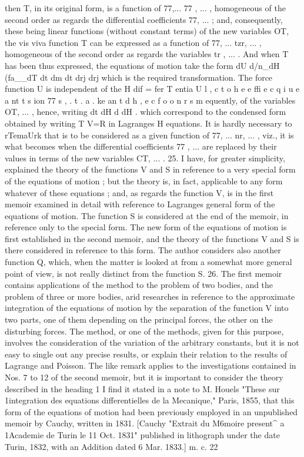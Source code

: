\documentclass[12pt,a4paper]{article}
\theoremstyle{definition}
\begin{document}
then T, in its original form, is a function of 77,... 77 , ... , homogeneous of the second
order as regards the differential coefficients 77, ... ; and, consequently, these being linear
functions (without constant terms) of the new variables OT, the vis viva function T
can be expressed as a function of 77, ... tzr, ... , homogeneous of the second order as
regards the variables tr , ... . And when T has been thus expressed, the equations of
motion take the form
dU
d/n_dH (fa__dT
dt dm dt drj drj
which is the required transformation. The force function U is independent of the
H dif = fer T entia U l , c t o h e e ffi e c q i u e a nt t s ion 77 s , . t . a . ke an t d h , e c f o o n r s m equently, of the variables OT, ... , hence, writing
dt dH d dH
.
which correspond to the condensed form obtained by writing T V=R in Lagranges
H
equations. It is hardly necessary to rTemaUrk that is to be considered as a given
function of 77, ... nr, ... , viz., it is what becomes when the differential coefficients
77 , ... are replaced by their values in terms of the new variables CT, ... .
25. I have, for greater simplicity, explained the theory of the functions V and S
in reference to a very special form of the equations of motion ; but the theory is, in
fact, applicable to any form whatever of these equations ; and, as regards the function V,
is in the first memoir examined in detail with reference to Lagranges general form
of the equations of motion. The function S is considered at the end of the memoir,
in reference only to the special form. The new form of the equations of motion is
first established in the second memoir, and the theory of the functions V and S is
there considered in reference to this form. The author considers also another function
Q, which, when the matter is looked at from a somewhat more general point of view,
is not really distinct from the function S.
26. The first memoir contains applications of the method to the problem of two
bodies, and the problem of three or more bodies, arid researches in reference to the
approximate integration of the equations of motion by the separation of the function
V
into two parts, one of them depending on the principal forces, the other on the
disturbing forces. The method, or one of the methods, given for this purpose, involves
the consideration of the variation of the arbitrary constants, but it is not easy to
single out any precise results, or explain their relation to the results of Lagrange and
Poisson. The like remark applies to the investigations contained in Nos. 7 to 12 of
the second memoir, but it is important to consider the theory described in the heading
1 I find it stated in a note to M. Houels "These sur 1integration des equations differentielles de la
Mecanique," Paris, 1855, that this form of the equations of motion had been previously employed in an
unpublished memoir by Cauchy, written in 1831. [Cauchy "Extrait du M6moire present^ a 1Academie de
Turin le 11 Oct. 1831" published in lithograph under the date Turin, 1832, with an Addition dated
6 Mar. 1833.]
m.
c. 22
\end{document}
